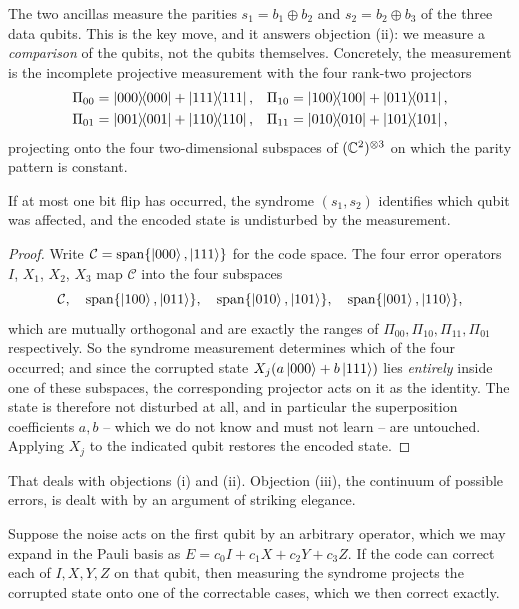 \documentclass[a4paper]{scrartcl}
\begin{document}
The two ancillas measure the parities $s_1 = b_1\oplus b_2$ and $s_2 = b_2\oplus b_3$ of the three data qubits. This is the key move, and it answers objection (ii): we measure a \emph{comparison} of the qubits, not the qubits themselves. Concretely, the measurement is the incomplete projective measurement with the four rank-two projectors
\begin{align*}
	\Pi_{00} &= \op{000}{000}+\op{111}{111}, & \Pi_{10} &= \op{100}{100}+\op{011}{011},\\
	\Pi_{01} &= \op{001}{001}+\op{110}{110}, & \Pi_{11} &= \op{010}{010}+\op{101}{101},
\end{align*}
projecting onto the four two-dimensional subspaces of $(\mathbb{C}^2)^{\otimes3}$ on which the parity pattern is constant.

\begin{proposition}
	If at most one bit flip has occurred, the syndrome $(s_1,s_2)$ identifies which qubit was affected, and the encoded state is undisturbed by the measurement.
\end{proposition}

\begin{proof}
	Write $\mathcal C = \operatorname{span}\{\ket{000},\ket{111}\}$ for the code space. The four error operators $I$, $X_1$, $X_2$, $X_3$ map $\mathcal C$ into the four subspaces
	$$\mathcal C,\quad \operatorname{span}\{\ket{100},\ket{011}\},\quad\operatorname{span}\{\ket{010},\ket{101}\},\quad\operatorname{span}\{\ket{001},\ket{110}\},$$
	which are mutually orthogonal and are exactly the ranges of $\Pi_{00},\Pi_{10},\Pi_{11},\Pi_{01}$ respectively. So the syndrome measurement determines which of the four occurred; and since the corrupted state $X_j(a\ket{000}+b\ket{111})$ lies \emph{entirely} inside one of these subspaces, the corresponding projector acts on it as the identity. The state is therefore not disturbed at all, and in particular the superposition coefficients $a,b$ -- which we do not know and must not learn -- are untouched. Applying $X_j$ to the indicated qubit restores the encoded state.
\end{proof}

That deals with objections (i) and (ii). Objection (iii), the continuum of possible errors, is dealt with by an argument of striking elegance.

\begin{proposition}
	Suppose the noise acts on the first qubit by an arbitrary operator, which we may expand in the Pauli basis as $E = c_0I+c_1X+c_2Y+c_3Z$. If the code can correct each of $I,X,Y,Z$ on that qubit, then measuring the syndrome projects the corrupted state onto one of the correctable cases, which we then correct exactly.
\end{proposition}
\end{document}
